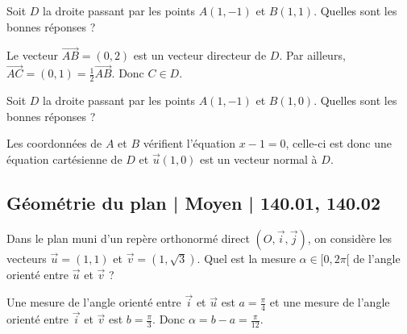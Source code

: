 \begin{question}
Soit $D$ la droite passant par les points $A(1,-1)$ et $B(1,1)$. Quelles sont les bonnes réponses ?
\begin{answers}  
\end{answers}
\begin{explanations}
Le vecteur $\overrightarrow{AB}=(0,2)$ est un vecteur directeur de $D$. Par ailleurs, $\overrightarrow{AC}=(0,1)=\frac{1}{2}\overrightarrow{AB}$. Donc $C\in D$.
\end{explanations}
\end{question}


\begin{question}
Soit $D$ la droite passant par les points $A(1,-1)$ et $B(1,0)$. Quelles sont les bonnes réponses ?
\begin{answers}  
\end{answers}
\begin{explanations}
Les coordonnées de $A$ et $B$ vérifient l'équation $x-1=0$, celle-ci est donc une équation cartésienne de $D$ et $\vec{u}(1,0)$ est un vecteur normal à $D$.
\end{explanations}
\end{question}


\subsection{Géométrie du plan | Moyen | 140.01, 140.02}


\begin{question}
Dans le plan muni d'un repère orthonormé direct $(O,\vec{i},\vec{j})$, on considère les vecteurs $\displaystyle \vec{u}=\left(1,1\right)$ et $\displaystyle \vec{v}=\left(1,\sqrt{3}\right)$. Quel est la mesure $\alpha \in [0,2\pi[$ de l'angle orienté entre $\vec{u}$ et $\vec{v}$ ?
\begin{answers}  
\end{answers}
\begin{explanations}
Une mesure de l'angle orienté entre $\vec{i}$ et $\vec{u}$ est $\displaystyle a=\frac{\pi}{4}$ et une mesure de l'angle orienté entre $\vec{i}$ et $\vec{v}$ est $\displaystyle b=\frac{\pi}{3}$. Donc $\displaystyle \alpha =b-a=\frac{\pi}{12}$.
\end{explanations}
\end{question}


